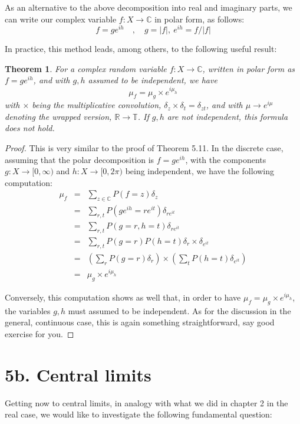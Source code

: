 \documentclass[12pt]{amsbook}
\newtheorem{theorem}{Theorem}[chapter]
\begin{document}
As an alternative to the above decomposition into real and imaginary parts, we can write our  complex variable $f:X\to\mathbb C$ in polar form, as follows:
$$f=ge^{ih}\quad,\quad g=|f|,\ e^{ih}=f/|f|$$

In practice, this method leads, among others, to the following useful result:


\begin{theorem}
For a complex random variable $f:X\to\mathbb C$, written in polar form as $f=ge^{ih}$, and with $g,h$ assumed to be independent, we have
$$\mu_f=\mu_g\times e^{i\mu_h}$$
with $\times$ being the multiplicative convolution, $\delta_z\times\delta_t=\delta_{zt}$, and with $\mu\to e^{i\mu}$ denoting the wrapped version, $\mathbb R\to\mathbb T$. If $g,h$ are not independent, this formula does not hold.
\end{theorem}

\begin{proof}
This is very similar to the proof of Theorem 5.11. In the discrete case, assuming that the polar decomposition is $f=ge^{ih}$, with the components $g:X\to[0,\infty)$ and $h:X\to[0,2\pi)$ being independent, we have the following computation:
\begin{eqnarray*}
\mu_f
&=&\sum_{z\in\mathbb C}P(f=z)\delta_z\\
&=&\sum_{r,t}P(ge^{ih}=re^{it})\delta_{re^{it}}\\
&=&\sum_{r,t}P(g=r,h=t)\delta_{re^{it}}\\
&=&\sum_{r,t}P(g=r)P(h=t)\delta_r\times\delta_{e^{it}}\\
&=&\left(\sum_rP(g=r)\delta_r\right)\times
\left(\sum_tP(h=t)\delta_{e^{it}}\right)\\
&=&\mu_g\times e^{i\mu_h}
\end{eqnarray*}

Conversely, this computation shows as well that, in order to have $\mu_f=\mu_g\times e^{i\mu_h}$, the variables $g,h$ must assumed to be independent. As for the discussion in the general, continuous case, this is again something straightforward, say good exercise for you.
\end{proof}

\section*{5b. Central limits}

Getting now to central limits, in analogy with what we did in chapter 2 in the real case, we would like to investigate the following fundamental question:
\end{document}

